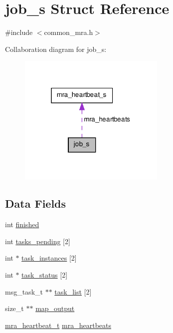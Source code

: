 \hypertarget{structjob__s}{\section{job\-\_\-s \-Struct \-Reference}
\label{structjob__s}
}


{\ttfamily \#include $<$common\-\_\-mra.\-h$>$}



\-Collaboration diagram for job\-\_\-s\-:
\nopagebreak
\begin{figure}[H]
\begin{center}
\leavevmode
\includegraphics[width=199pt]{structjob__s__coll__graph}
\end{center}
\end{figure}
\subsection*{\-Data \-Fields}
\begin{DoxyCompactItemize}
\item 
int \hyperlink{structjob__s_ab8937d6bc68b0fc735d85461886a5d81}{finished}
\item 
int \hyperlink{structjob__s_a2121f93a58679fe228efdefe7bdcd1ba}{tasks\-\_\-pending} \mbox{[}2\mbox{]}
\item 
int $\ast$ \hyperlink{structjob__s_a511f43e33a73ddbda1ec080c2f972e33}{task\-\_\-instances} \mbox{[}2\mbox{]}
\item 
int $\ast$ \hyperlink{structjob__s_a25c05f7bc2c55b8626a947c42fbea207}{task\-\_\-status} \mbox{[}2\mbox{]}
\item 
msg\-\_\-task\-\_\-t $\ast$$\ast$ \hyperlink{structjob__s_a30c1a20fc86906cb521672940ff65c0f}{task\-\_\-list} \mbox{[}2\mbox{]}
\item 
size\-\_\-t $\ast$$\ast$ \hyperlink{structjob__s_aaf7015affb185128aab0ad5420310c74}{map\-\_\-output}
\item 
\hyperlink{common__mra_8h_a9a9d834f744f36f4e51ebf6c532e26bd}{mra\-\_\-heartbeat\-\_\-t} \hyperlink{structjob__s_a7e379eed44e91688e48a9ff5ff5a12c9}{mra\-\_\-heartbeats}
\end{DoxyCompactItemize}


